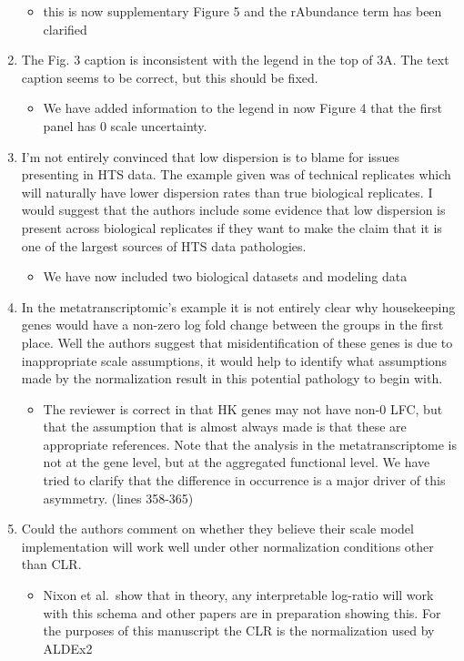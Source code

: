 \documentclass[
]{article}
\providecommand{\tightlist}{%
  \setlength{\itemsep}{0pt}\setlength{\parskip}{0pt}}
\begin{document}
\begin{enumerate}
  \begin{itemize}
  \tightlist
  \item
    this is now supplementary Figure 5 and the rAbundance term has been
    clarified
  \end{itemize}
\item
  The Fig. 3 caption is inconsistent with the legend in the top of 3A.
  The text caption seems to be correct, but this should be fixed.

  \begin{itemize}
  \tightlist
  \item
    We have added information to the legend in now Figure 4 that the
    first panel has 0 scale uncertainty.
  \end{itemize}
\item
  I'm not entirely convinced that low dispersion is to blame for issues
  presenting in HTS data. The example given was of technical replicates
  which will naturally have lower dispersion rates than true biological
  replicates. I would suggest that the authors include some evidence
  that low dispersion is present across biological replicates if they
  want to make the claim that it is one of the largest sources of HTS
  data pathologies.

  \begin{itemize}
  \tightlist
  \item
    We have now included two biological datasets and modeling data
  \end{itemize}
\item
  In the metatranscriptomic's example it is not entirely clear why
  housekeeping genes would have a non-zero log fold change between the
  groups in the first place. Well the authors suggest that
  misidentification of these genes is due to inappropriate scale
  assumptions, it would help to identify what assumptions made by the
  normalization result in this potential pathology to begin with.

  \begin{itemize}
  \tightlist
  \item
    The reviewer is correct in that HK genes may not have non-0 LFC, but
    that the assumption that is almost always made is that these are
    appropriate references. Note that the analysis in the
    metatranscriptome is not at the gene level, but at the aggregated
    functional level. We have tried to clarify that the difference in
    occurrence is a major driver of this asymmetry. (lines 358-365)
  \end{itemize}
\item
  Could the authors comment on whether they believe their scale model
  implementation will work well under other normalization conditions
  other than CLR.

  \begin{itemize}
  \tightlist
  \item
    Nixon et al.~show that in theory, any interpretable log-ratio will
    work with this schema and other papers are in preparation showing
    this. For the purposes of this manuscript the CLR is the
    normalization used by ALDEx2
  \end{itemize}
\end{enumerate}
\end{document}
